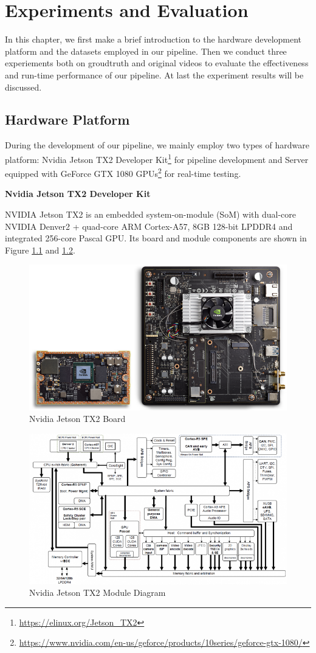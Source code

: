 
\chapter{Experiments and Evaluation}
\label{sec:experiment_evaluation}

In this chapter, we first make a brief introduction to the hardware development platform and the datasets employed in our pipeline. Then we conduct three experiements both on groudtruth and original videos to evaluate the effectiveness and run-time performance of our pipeline. At last the experiment results will be discussed. 

\section{Hardware Platform}

During the development of our pipeline, we mainly employ two types of hardware platform: Nvidia Jetson TX2 Developer Kit\footnote{\url{https://elinux.org/Jetson_TX2}} for pipeline development and Server equipped with GeForce GTX 1080 GPUs\footnote{\url{https://www.nvidia.com/en-us/geforce/products/10series/geforce-gtx-1080/}} for real-time testing.

\textbf{Nvidia Jetson TX2 Developer Kit}

NVIDIA Jetson TX2 is an embedded system-on-module (SoM) with dual-core NVIDIA Denver2 + quad-core ARM Cortex-A57, 8GB 128-bit LPDDR4 and integrated 256-core Pascal GPU. Its board and module components are shown in Figure \ref{fig:tx2_board} and \ref{fig:tx2_module}. 

\begin{figure}[h!]
  \centering
  \includegraphics[width=0.6\linewidth]{ExpAndDiss/tx2_board.png}
  \caption{Nvidia Jetson TX2 Board}
  \label{fig:tx2_board}
\end{figure} 

\begin{figure}[h!]
  \centering
  \includegraphics[width=0.6\linewidth]{ExpAndDiss/tx2_module.png}
  \caption{Nvidia Jetson TX2 Module Diagram}
  \label{fig:tx2_module}
\end{figure} 


